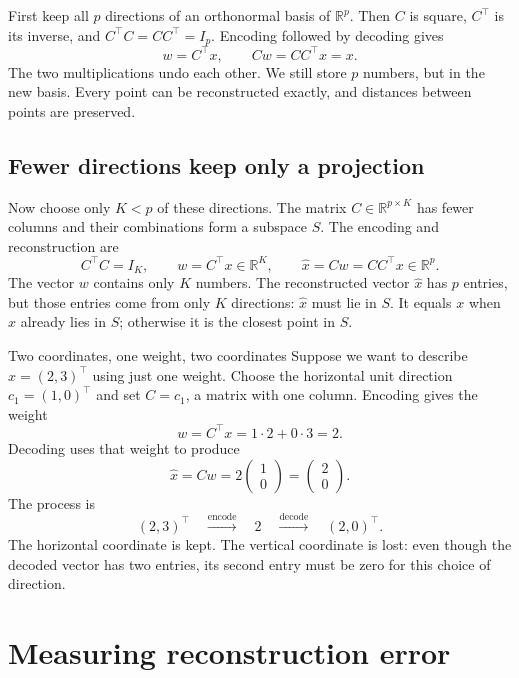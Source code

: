 First keep all $p$ directions of an orthonormal basis of
$\mathbb{R}^p$. Then $C$ is square, $C^\top$ is its inverse, and
$C^\top C=CC^\top=I_p$. Encoding followed by decoding gives
\[
  w=C^\top x,\qquad Cw=CC^\top x=x.
\]
The two multiplications undo each other. We still store $p$ numbers,
but in the new basis. Every point can be reconstructed exactly, and
distances between points are preserved.

\subsection{Fewer directions keep only a projection}

Now choose only $K<p$ of these directions. The matrix
$C\in\mathbb{R}^{p\times K}$ has fewer columns and their combinations
form a subspace $S$. The encoding and reconstruction are
\[
  C^\top C=I_K,\qquad
  w=C^\top x\in\mathbb{R}^K,\qquad
  \hat{x}=Cw=CC^\top x\in\mathbb{R}^p.
\]
The vector $w$ contains only $K$ numbers. The reconstructed vector
$\hat{x}$ has $p$ entries, but those entries come from only $K$
directions: $\hat{x}$ must lie in $S$. It equals $x$ when $x$ already
lies in $S$; otherwise it is the closest point in $S$.

\begin{framedexample}{Two coordinates, one weight, two coordinates}
Suppose we want to describe $x=(2,3)^\top$ using just one weight.
Choose the horizontal unit direction $c_1=(1,0)^\top$ and set
$C=c_1$, a matrix with one column. Encoding gives the weight
\[
  w=C^\top x=1\cdot2+0\cdot3=2.
\]
Decoding uses that weight to produce
\[
  \hat{x}=Cw=2\begin{pmatrix}1\\0\end{pmatrix}
          =\begin{pmatrix}2\\0\end{pmatrix}.
\]
The process is
\[
  (2,3)^\top
    \quad\xrightarrow{\text{encode}}\quad 2
    \quad\xrightarrow{\text{decode}}\quad (2,0)^\top.
\]
The horizontal coordinate is kept. The vertical coordinate is lost:
even though the decoded vector has two entries, its second entry must
be zero for this choice of direction.
\end{framedexample}

\section{Measuring reconstruction error}


